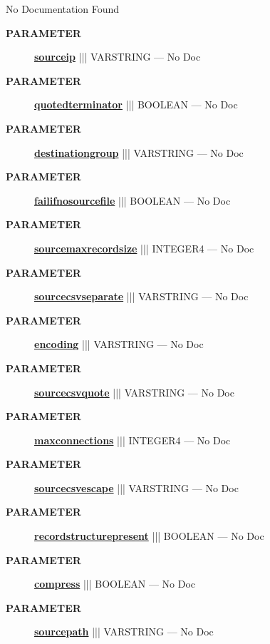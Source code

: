 \par





No Documentation Found






\par
\begin{description}
\item [\colorbox{tagtype}{\color{white} \textbf{\textsf{PARAMETER}}}] \textbf{\underline{sourceip}} ||| VARSTRING --- No Doc
\item [\colorbox{tagtype}{\color{white} \textbf{\textsf{PARAMETER}}}] \textbf{\underline{quotedterminator}} ||| BOOLEAN --- No Doc
\item [\colorbox{tagtype}{\color{white} \textbf{\textsf{PARAMETER}}}] \textbf{\underline{destinationgroup}} ||| VARSTRING --- No Doc
\item [\colorbox{tagtype}{\color{white} \textbf{\textsf{PARAMETER}}}] \textbf{\underline{failifnosourcefile}} ||| BOOLEAN --- No Doc
\item [\colorbox{tagtype}{\color{white} \textbf{\textsf{PARAMETER}}}] \textbf{\underline{sourcemaxrecordsize}} ||| INTEGER4 --- No Doc
\item [\colorbox{tagtype}{\color{white} \textbf{\textsf{PARAMETER}}}] \textbf{\underline{sourcecsvseparate}} ||| VARSTRING --- No Doc
\item [\colorbox{tagtype}{\color{white} \textbf{\textsf{PARAMETER}}}] \textbf{\underline{encoding}} ||| VARSTRING --- No Doc
\item [\colorbox{tagtype}{\color{white} \textbf{\textsf{PARAMETER}}}] \textbf{\underline{sourcecsvquote}} ||| VARSTRING --- No Doc
\item [\colorbox{tagtype}{\color{white} \textbf{\textsf{PARAMETER}}}] \textbf{\underline{maxconnections}} ||| INTEGER4 --- No Doc
\item [\colorbox{tagtype}{\color{white} \textbf{\textsf{PARAMETER}}}] \textbf{\underline{sourcecsvescape}} ||| VARSTRING --- No Doc
\item [\colorbox{tagtype}{\color{white} \textbf{\textsf{PARAMETER}}}] \textbf{\underline{recordstructurepresent}} ||| BOOLEAN --- No Doc
\item [\colorbox{tagtype}{\color{white} \textbf{\textsf{PARAMETER}}}] \textbf{\underline{compress}} ||| BOOLEAN --- No Doc
\item [\colorbox{tagtype}{\color{white} \textbf{\textsf{PARAMETER}}}] \textbf{\underline{sourcepath}} ||| VARSTRING --- No Doc

\end{description}

